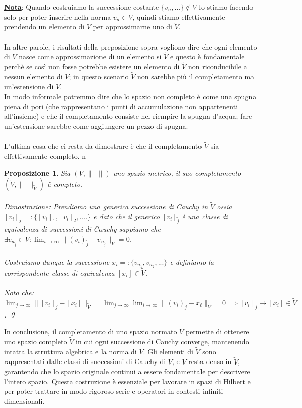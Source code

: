 \documentclass[a4paper,12pt]{report}
\newtheorem{proposizione}{Proposizione}[chapter]
\begin{document}
\underline{\textbf{Nota}}: Quando costruiamo la successione costante $\{v_n,...\} \notin V$ lo stiamo facendo solo per poter inserire nella norma $v_n \in V$, quindi stiamo effettivamente prendendo un elemento di $V$ per approssimarne uno di $\tilde{V}$.
\\
\\In altre parole, i risultati della preposizione sopra vogliono dire che ogni elemento di $V$ nasce come approssimazione di un elemento si $\tilde{V}$ e questo è fondamentale perchè se così non fosse potrebbe esistere un elemento di $\tilde{V}$ non riconducibile a nessun elemento di $V$; in questo scenario $\tilde{V}$ non sarebbe più il completamento ma un'estensione di $V$. 
\\ In modo informale potremmo dire che lo spazio non completo è come una spugna piena di pori (che rappresentano i punti di accumulazione non appartenenti all'insieme) e che il completamento consiste nel riempire la spugna d'acqua; fare un'estensione sarebbe come aggiungere un pezzo di spugna.
\\
\\ L'ultima cosa che ci resta da dimostrare è che il completamento $\tilde{V}$ sia effettivamente completo.
n 
\begin{proposizione}
    Sia $(V, \| \ \ \|)$ uno spazio metrico, il suo completamento $(\tilde{V}, \| \ \ \|_{\tilde{V}})$ è completo.
    \\
    \\ \underline{Dimostrazione}: Prendiamo una generica successione di Cauchy in $\tilde{V}$ ossia $[v_i]_j=:\{[v_i]_1,[v_i]_2,....\}$ e dato che il generico $[v_i]_{\tilde{j}}$ è una classe di equivalenza di successioni di Cauchy sappiamo che  $\exists v_{n_{\tilde{j}}} \in V: \displaystyle\lim_{i \to \infty}\|(v_i)_{\tilde{j}}-v_{n_{\tilde{j}}}\|_V=0$. 
    \\
    \\Costruiamo dunque la successione $x_i=:\{v_{n_1},v_{n_2},...\}$ e definiamo la corrispondente classe di equivalenza $[x_i] \in \tilde{V}$. 
    \\
    \\Noto che: $\displaystyle\lim_{j\to\infty}\|[v_i]_j-[x_i]\|_{\tilde{V}}=\displaystyle\lim_{j \to\infty}\lim_{i \to \infty}\|(v_i)_{j}-x_i\|_V=0\implies [v_i]_j \to [x_i] \in \tilde{V}$. \qed
\end{proposizione}

In conclusione, il completamento di uno spazio normato $V$ permette di ottenere uno spazio completo $\tilde{V}$ in cui ogni successione di Cauchy converge, mantenendo intatta la struttura algebrica e la norma di $V$. Gli elementi di $\tilde{V}$ sono rappresentati dalle classi di successioni di Cauchy di $V$, e $V$ resta denso in $\tilde{V}$, garantendo che lo spazio originale continui a essere fondamentale per descrivere l’intero spazio. Questa costruzione è essenziale per lavorare in spazi di Hilbert e per poter trattare in modo rigoroso serie e operatori in contesti infiniti-dimensionali.
\end{document}

